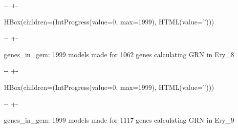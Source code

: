 \documentclass[letterpaper,10pt,english]{sphinxmanual}
\newlength\nbsphinxcodecellspacing
\begin{document}
{

\kern-\sphinxverbatimsmallskipamount\kern-\baselineskip
\kern+\FrameHeightAdjust\kern-\fboxrule
\vspace{\nbsphinxcodecellspacing}

\begin{sphinxVerbatim}[commandchars=\\\{\}]
HBox(children=(IntProgress(value=0, max=1999), HTML(value='')))
\end{sphinxVerbatim}
}

{

\kern-\sphinxverbatimsmallskipamount\kern-\baselineskip
\kern+\FrameHeightAdjust\kern-\fboxrule
\vspace{\nbsphinxcodecellspacing}

\begin{sphinxVerbatim}[commandchars=\\\{\}]

genes\_in\_gem: 1999
models made for 1062 genes
calculating GRN in Ery\_8
\end{sphinxVerbatim}
}

{

\kern-\sphinxverbatimsmallskipamount\kern-\baselineskip
\kern+\FrameHeightAdjust\kern-\fboxrule
\vspace{\nbsphinxcodecellspacing}

\begin{sphinxVerbatim}[commandchars=\\\{\}]
HBox(children=(IntProgress(value=0, max=1999), HTML(value='')))
\end{sphinxVerbatim}
}

{

\kern-\sphinxverbatimsmallskipamount\kern-\baselineskip
\kern+\FrameHeightAdjust\kern-\fboxrule
\vspace{\nbsphinxcodecellspacing}

\begin{sphinxVerbatim}[commandchars=\\\{\}]

genes\_in\_gem: 1999
models made for 1117 genes
calculating GRN in Ery\_9
\end{sphinxVerbatim}
}
\end{document}
